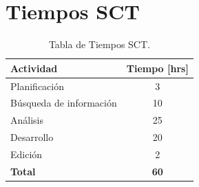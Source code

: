 \documentclass[letterpaper,12pt]{article}
\begin{document}
\section{Tiempos SCT}

\begin{table}[H]
    \centering
    \begin{tabular}{|l|c|}
        \hline 
        \textbf{Actividad} & \textbf{Tiempo [hrs]}\\
        \hline
        Planificación & 3\\
        \hline
        Búsqueda de información & 10\\
        \hline
        Análisis & 25\\
        \hline
        Desarrollo & 20\\
        \hline
        Edición & 2\\
        \hline
        \textbf{Total} & \textbf{60}\\
        \hline
    \end{tabular}
    \label{tab:actividades} 
    \caption{Tabla de Tiempos SCT.}
\end{table}

\newpage

{}
\end{document}
